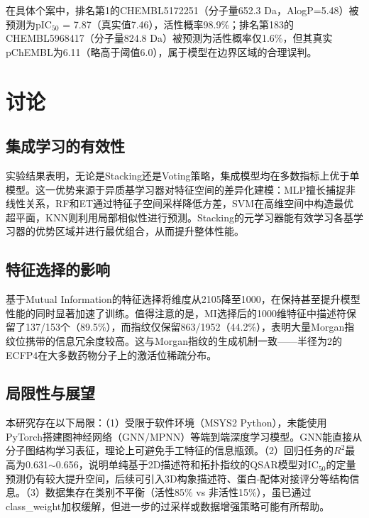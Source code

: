 \documentclass[12pt,a4paper]{article}
\begin{document}
在具体个案中，排名第1的CHEMBL5172251（分子量652.3 Da，AlogP=5.48）被预测为pIC$_{50}$ = 7.87（真实值7.46），活性概率98.9\%；排名第183的CHEMBL5968417（分子量824.8 Da）被预测为活性概率仅1.6\%，但其真实pChEMBL为6.11（略高于阈值6.0），属于模型在边界区域的合理误判。

\section{讨论}

\subsection{集成学习的有效性}

实验结果表明，无论是Stacking还是Voting策略，集成模型均在多数指标上优于单模型。这一优势来源于异质基学习器对特征空间的差异化建模：MLP擅长捕捉非线性关系，RF和ET通过特征子空间采样降低方差，SVM在高维空间中构造最优超平面，KNN则利用局部相似性进行预测。Stacking的元学习器能有效学习各基学习器的优势区域并进行最优组合，从而提升整体性能。

\subsection{特征选择的影响}

基于Mutual Information的特征选择将维度从2105降至1000，在保持甚至提升模型性能的同时显著加速了训练。值得注意的是，MI选择后的1000维特征中描述符保留了137/153个（89.5\%），而指纹仅保留863/1952（44.2\%），表明大量Morgan指纹位携带的信息冗余度较高。这与Morgan指纹的生成机制一致——半径为2的ECFP4在大多数药物分子上的激活位稀疏分布。

\subsection{局限性与展望}

本研究存在以下局限：（1）受限于软件环境（MSYS2 Python），未能使用PyTorch搭建图神经网络（GNN/MPNN）等端到端深度学习模型。GNN能直接从分子图结构学习表征，理论上可避免手工特征的信息瓶颈。（2）回归任务的$R^2$最高为0.631$\sim$0.656，说明单纯基于2D描述符和拓扑指纹的QSAR模型对IC$_{50}$的定量预测仍有较大提升空间，后续可引入3D构象描述符、蛋白-配体对接评分等结构信息。（3）数据集存在类别不平衡（活性85\% vs 非活性15\%），虽已通过class\_weight加权缓解，但进一步的过采样或数据增强策略可能有所帮助。
\end{document}
